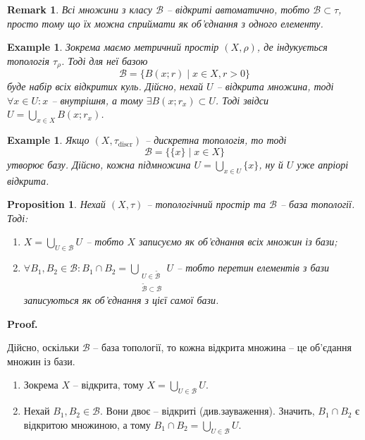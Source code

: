 \documentclass[a4paper, 10pt]{article}
\makeatletter
\theoremstyle{theoremdd}
\newtheorem{example}[theorem]{Example}
\newtheorem{proposition}[theorem]{Proposition}
\newtheorem{remark}[theorem]{Remark}
\renewenvironment{proof}[1][Proof.\\]{\par
\pushQED{\hfill \qed}%
\normalfont \topsep6\p@\@plus6\p@\relax
\trivlist
\item\relax
{\bfseries
#1\@addpunct{.}}\hspace\labelsep\ignorespaces
}{%
\popQED\endtrivlist\@endpefalse
}
\makeatother
\begin{document}
\begin{remark}
Всі множини з класу $\mathcal{B}$ -- відкриті автоматично, тобто $\mathcal{B} \subset \tau$, просто тому що їх можна сприймати як об'єднання з одного елементу.
\end{remark}

\begin{example}
Зокрема маємо метричний простір $(X,\rho)$, де індукується топологія $\tau_\rho$. Тоді для неї базою
\[
\mathcal{B} = \{ B(x;r) \mid x \in X, r > 0 \}
\]
буде набір всіх відкритих куль. Дійсно, нехай $U$ -- відкрита множина, тоді $\forall x \in U: x$ -- внутрішня, а тому $\exists B(x;r_x) \subset U$. Тоді звідси $U = \displaystyle\bigcup_{x \in X} B(x;r_x)$. 
\end{example}

\begin{example}
Якщо $(X,\tau_{\text{discr}})$ -- дискретна топологія, то тоді 
\[
\mathcal{B} = \{\{x\} \mid x \in X\}
\]
утворює базу. Дійсно, кожна підмножина $U = \displaystyle\bigcup_{x \in U} \{x\}$, ну й $U$ уже апріорі відкрита.
\end{example}

\begin{proposition}
Нехай $(X,\tau)$ -- топологічний простір та $\mathcal{B}$ -- база топології. Тоді:
\begin{enumerate}[nosep,wide=0pt,label={\arabic*)}]
\item $X = \displaystyle\bigcup_{U \in \mathcal{B}} U$ -- тобто $X$ записуємо як об'єднання всіх множин із бази;
\item $\forall B_1,B_2 \in \mathcal{B}: B_1 \cap B_2 = \displaystyle\bigcup_{\substack{U \in \mathcal{\tilde{B}} \\ \mathcal{\tilde{B}} \subset \mathcal{B}}} U$ -- тобто перетин елементів з бази записуються як об'єднання з цієї самої бази.
\end{enumerate}
\end{proposition}

\begin{proof}
Дійсно, оскільки $\mathcal{B}$ -- база топології, то кожна відкрита множина -- це об'єдання множин із бази.
\begin{enumerate}[nosep,wide=0pt,label={\arabic*)}]
\item Зокрема $X$ -- відкрита, тому $X = \displaystyle\bigcup_{U \in \mathcal{B}} U$.
\item Нехай $B_1,B_2 \in \mathcal{B}$. Вони двоє -- відкриті (див.\@ зауваження). Значить, $B_1 \cap B_2$ є відкритою множиною, а тому $B_1 \cap B_2 = \displaystyle\bigcup_{U \in \mathcal{B}} U$. \qedhere
\end{enumerate}
\end{proof}
\end{document}
